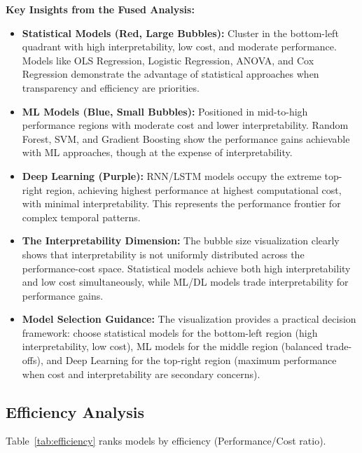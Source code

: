 \documentclass[11pt,a4paper]{article}
\begin{document}
\textbf{Key Insights from the Fused Analysis:}
\begin{itemize}
    \item \textbf{Statistical Models (Red, Large Bubbles):} Cluster in the bottom-left quadrant with high interpretability, low cost, and moderate performance. Models like OLS Regression, Logistic Regression, ANOVA, and Cox Regression demonstrate the advantage of statistical approaches when transparency and efficiency are priorities.
    
    \item \textbf{ML Models (Blue, Small Bubbles):} Positioned in mid-to-high performance regions with moderate cost and lower interpretability. Random Forest, SVM, and Gradient Boosting show the performance gains achievable with ML approaches, though at the expense of interpretability.
    
    \item \textbf{Deep Learning (Purple):} RNN/LSTM models occupy the extreme top-right region, achieving highest performance at highest computational cost, with minimal interpretability. This represents the performance frontier for complex temporal patterns.
    
    \item \textbf{The Interpretability Dimension:} The bubble size visualization clearly shows that interpretability is not uniformly distributed across the performance-cost space. Statistical models achieve both high interpretability and low cost simultaneously, while ML/DL models trade interpretability for performance gains.
    
    \item \textbf{Model Selection Guidance:} The visualization provides a practical decision framework: choose statistical models for the bottom-left region (high interpretability, low cost), ML models for the middle region (balanced trade-offs), and Deep Learning for the top-right region (maximum performance when cost and interpretability are secondary concerns).
\end{itemize}

\subsection{Efficiency Analysis}

Table~\ref{tab:efficiency} ranks models by efficiency (Performance/Cost ratio).
\end{document}
